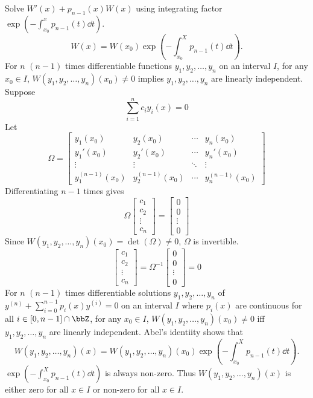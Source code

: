 \documentclass[a4paper,12pt]{report}
\begin{document}
Solve $W'(x)+p_{n-1}(x)W(x)$ using integrating factor $\exp(-\int_{x_0}^xp_{n-1}(t)\dd{t})$.
\[W(x)=W(x_0)\exp(-\int_{x_0}^Xp_{n-1}(t)\dd{t}).\]
\epr
{}
For $n$ $(n-1)$ times differentiable functions $y_1,y_2,\ldots,y_n$ on an interval $I$, for any $x_0\in I$, $W(y_1,y_2,\ldots,y_n)(x_0)\ne 0$ implies $y_1,y_2,\ldots,y_n$ are linearly independent.
\bpr
Suppose
\[\sum_{i=1}^nc_iy_i(x)=0\]
Let
\[\Omega=\begin{bmatrix}
y_1(x_0) & y_2(x_0) & \cdots & y_n(x_0) \\
y_1'(x_0) & y_2'(x_0) & \cdots & y_n'(x_0) \\
\vdots & \vdots & \ddots & \vdots \\
y_1^{(n-1)}(x_0) & y_2^{(n-1)}(x_0) & \cdots & y_n^{(n-1)}(x_0)
\end{bmatrix}\]
Differentiating $n-1$ times gives
\[\Omega\begin{bmatrix}c_1\\c_2\\\vdots\\c_n\end{bmatrix}=\begin{bmatrix}0\\0\\\vdots\\0\end{bmatrix}\]
Since $W(y_1,y_2,\ldots,y_n)(x_0)=\det(\Omega)\ne0$, $\Omega$ is invertible.
\[\begin{bmatrix}c_1\\c_2\\\vdots\\c_n\end{bmatrix}=\Omega^{-1}\begin{bmatrix}0\\0\\\vdots\\0\end{bmatrix}=0\]
\epr
{}
For $n$ $(n-1)$ times differentiable solutions $y_1,y_2,\ldots,y_n$ of $y^{(n)}+\sum_{i=0}^{n-1}p_i(x)y^{(i)}=0$ on an interval $I$ where $p_i(x)$ are continuous for all $i\in[0,n-1]\cap\bbZ$, for any $x_0\in I$, $W(y_1,y_2,\ldots,y_n)(x_0)\ne 0$ iff $y_1,y_2,\ldots,y_n$ are linearly independent.
\bpr
Abel's identiity shows that
\[W(y_1,y_2,\ldots,y_n)(x)=W(y_1,y_2,\ldots,y_n)(x_0)\exp(-\int_{x_0}^Xp_{n-1}(t)\dd{t}).\]
$\exp(-\int_{x_0}^Xp_{n-1}(t)\dd{t})$ is always non-zero. Thus $W(y_1,y_2,\ldots,y_n)(x)$ is either zero for all $x\in I$ or non-zero for all $x\in I$.
\end{document}
